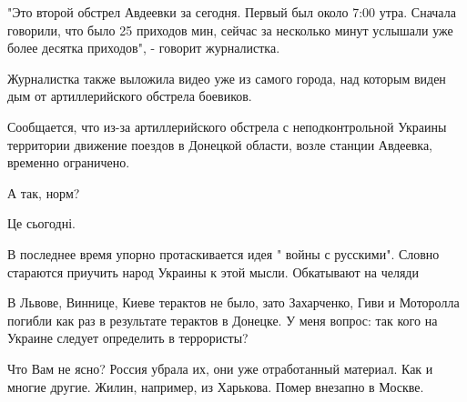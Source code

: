 \begin{itemize}
\begin{itemize}
"Это второй обстрел Авдеевки за сегодня. Первый был около 7:00 утра. Сначала
говорили, что было 25 приходов мин, сейчас за несколько минут услышали уже
более десятка приходов", - говорит журналистка.

Журналистка также выложила видео уже из самого города, над которым виден дым от
артиллерийского обстрела боевиков.

Сообщается, что из-за артиллерийского обстрела с неподконтрольной Украины
территории движение поездов в Донецкой области, возле станции Авдеевка,
временно ограничено.

А так, норм?

Це сьогодні.


\end{itemize}

 

В последнее время упорно протаскивается идея " войны с русскими". Словно
стараются приучить народ Украины к этой мысли. Обкатывают на челяди


 

В Львове, Виннице, Киеве терактов не было, зато Захарченко, Гиви и Моторолла
погибли как раз в результате терактов в Донецке. У меня вопрос: так кого на
Украине следует определить в террористы?

\begin{itemize}
 
Что Вам не ясно? Россия убрала их, они уже отработанный материал. Как и многие
другие. Жилин, например, из Харькова. Помер внезапно в Москве.

 

\end{itemize}
\end{itemize}
